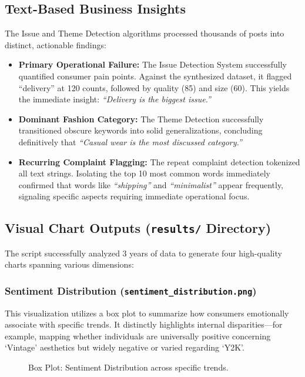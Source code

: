 \documentclass[conference]{IEEEtran}
\begin{document}
\subsection{Text-Based Business Insights}
The Issue and Theme Detection algorithms processed thousands of posts into distinct, actionable findings:
\begin{itemize}
    \item \textbf{Primary Operational Failure:} The Issue Detection System successfully quantified consumer pain points. Against the synthesized dataset, it flagged ``delivery'' at 120 counts, followed by quality (85) and size (60). This yields the immediate insight: \textit{``Delivery is the biggest issue.''}
    \item \textbf{Dominant Fashion Category:} The Theme Detection successfully transitioned obscure keywords into solid generalizations, concluding definitively that \textit{``Casual wear is the most discussed category.''}
    \item \textbf{Recurring Complaint Flagging:} The repeat complaint detection tokenized all text strings. Isolating the top 10 most common words immediately confirmed that words like \textit{``shipping''} and \textit{``minimalist''} appear frequently, signaling specific aspects requiring immediate operational focus.
\end{itemize}

\subsection{Visual Chart Outputs (\texttt{results/} Directory)}
The script successfully analyzed 3 years of data to generate four high-quality charts spanning various dimensions:

\subsubsection{Sentiment Distribution (\texttt{sentiment\_distribution.png})}
This visualization utilizes a box plot to summarize how consumers emotionally associate with specific trends. It distinctly highlights internal disparities—for example, mapping whether individuals are universally positive concerning `Vintage' aesthetics but widely negative or varied regarding `Y2K'.

\begin{figure}[htbp]
\centering
\fbox{\rule{0pt}{2in} \rule{0.9\linewidth}{0pt}}
\caption{Box Plot: Sentiment Distribution across specific trends.}
\label{fig:sentiment_dist}
\end{figure}
\end{document}
